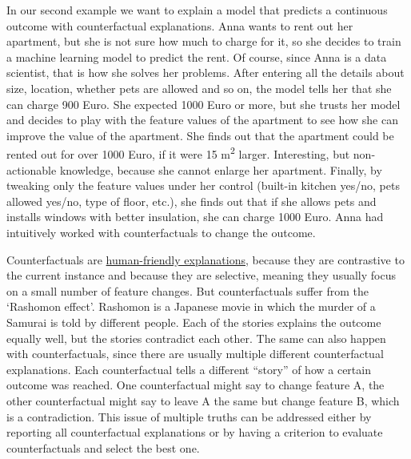 \documentclass[
  12pt,
]{krantz}
\begin{document}
In our second example we want to explain a model that predicts a continuous outcome with counterfactual explanations.
Anna wants to rent out her apartment, but she is not sure how much to charge for it, so she decides to train a machine learning model to predict the rent.
Of course, since Anna is a data scientist, that is how she solves her problems.
After entering all the details about size, location, whether pets are allowed and so on, the model tells her that she can charge 900 Euro.
She expected 1000 Euro or more, but she trusts her model and decides to play with the feature values of the apartment to see how she can improve the value of the apartment.
She finds out that the apartment could be rented out for over 1000 Euro, if it were 15 m\textsuperscript{2} larger.
Interesting, but non-actionable knowledge, because she cannot enlarge her apartment.
Finally, by tweaking only the feature values under her control (built-in kitchen yes/no, pets allowed yes/no, type of floor, etc.), she finds out that if she allows pets and installs windows with better insulation, she can charge 1000 Euro.
Anna had intuitively worked with counterfactuals to change the outcome.

Counterfactuals are \protect\hyperlink{good-explanation}{human-friendly explanations}, because they are contrastive to the current instance and because they are selective, meaning they usually focus on a small number of feature changes.
But counterfactuals suffer from the `Rashomon effect'.
Rashomon is a Japanese movie in which the murder of a Samurai is told by different people.
Each of the stories explains the outcome equally well, but the stories contradict each other.
The same can also happen with counterfactuals, since there are usually multiple different counterfactual explanations.
Each counterfactual tells a different ``story'' of how a certain outcome was reached.
One counterfactual might say to change feature A, the other counterfactual might say to leave A the same but change feature B, which is a contradiction.
This issue of multiple truths can be addressed either by reporting all counterfactual explanations or by having a criterion to evaluate counterfactuals and select the best one.
\end{document}
